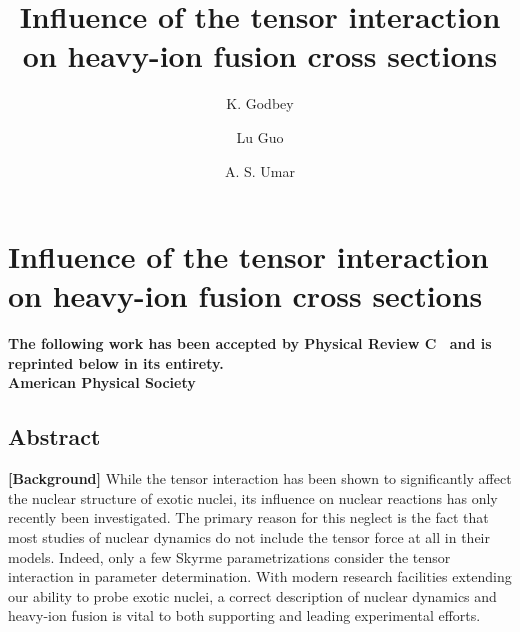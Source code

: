 
\chapter{Influence of the tensor interaction on heavy-ion fusion cross sections}\label{chapters:chapter_5}

\title{Influence of the tensor interaction on heavy-ion fusion cross sections}

\author[1]{K. Godbey}
\author[2,3]{Lu Guo}
\author[1]{A. S. Umar}


{

	\makeatletter

	\begin{center}
		\AB@authlist
		\AB@affillist
	\end{center}

	\makeatother
		\bfseries\centering
	The following work has been accepted by Physical Review C~\citep{godbey2019c} and is reprinted below in its entirety.\\
	 American Physical Society\\
}
\makeatletter
\renewcommand{\AB@affillist}{}
\renewcommand{\AB@authlist}{}
\setcounter{authors}{0}
\makeatother

\section{Abstract}

		{\bf [Background]}		
		While the tensor interaction has been shown to significantly affect the nuclear structure of exotic nuclei, its influence on nuclear reactions has only recently been investigated.
		The primary reason for this neglect is the fact that most studies of nuclear dynamics do not include the tensor force at all in their models.
		Indeed, only a few Skyrme parametrizations consider the tensor interaction in parameter determination.
		With modern research facilities extending our ability to probe exotic nuclei, a correct description of nuclear dynamics and heavy-ion fusion is vital to both supporting and leading experimental efforts.
		
